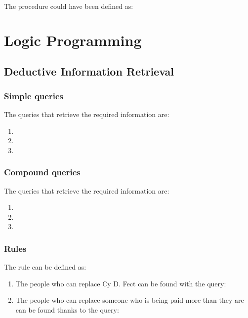 \begin{exe}[4.54]
    The  procedure could have been defined as:
\end{exe}

\section{Logic Programming}

\subsection{Deductive Information Retrieval}

\subsubsection{Simple queries}

\begin{exe}[4.55]
    The queries that retrieve the required information are:
    \begin{enumerate}
        \item {}
        \item {}
        \item {}
    \end{enumerate}
\end{exe}

\subsubsection{Compound queries}

\begin{exe}[4.56]
    The queries that retrieve the required information are:
    \begin{enumerate}
        \item {}
        \item {}
        \item {}
    \end{enumerate}
\end{exe}

\subsubsection{Rules}

\begin{exe}[4.57]
    The rule  can be defined as:
    \begin{enumerate}
        \item The people who can replace Cy D. Fect can be found with the query:
        \item The people who can replace someone who is being paid more than 
            they are can be found thanks to the query:
    \end{enumerate}
\end{exe}

